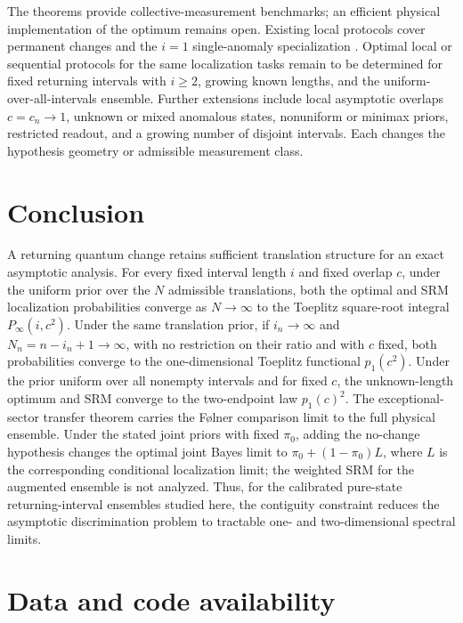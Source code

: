 The theorems provide collective-measurement benchmarks; an efficient physical
implementation of the optimum remains open. Existing local protocols cover
permanent changes and the \(i=1\) single-anomaly specialization
\cite{sentis2016,llorens2024}. Optimal local or sequential protocols for the
same localization tasks remain to be determined for fixed returning intervals
with \(i\ge2\), growing known lengths, and the uniform-over-all-intervals
ensemble. Further extensions
include local asymptotic overlaps \(c=c_n\to1\), unknown or mixed anomalous
states, nonuniform or minimax priors, restricted readout, and a growing number
of disjoint intervals. Each changes the hypothesis geometry or admissible
measurement class.

\section{Conclusion}\label{conclusion}

A returning quantum change retains sufficient translation structure for an
exact asymptotic analysis. For every fixed interval length \(i\) and fixed
overlap \(c\), under the uniform prior over the \(N\) admissible translations,
both the optimal and SRM localization probabilities converge as \(N\to\infty\)
to the Toeplitz square-root integral \(P_\infty(i,c^2)\). Under the same
translation prior, if \(i_n\to\infty\) and \(N_n=n-i_n+1\to\infty\), with no
restriction on their ratio and with \(c\) fixed, both probabilities converge to
the one-dimensional Toeplitz functional \(p_1(c^2)\). Under the prior uniform
over all nonempty intervals and for fixed
\(c\), the unknown-length optimum and SRM converge to the two-endpoint law
\(p_1(c)^2\). The exceptional-sector transfer theorem carries the Følner
comparison limit to the full physical ensemble. Under the stated joint priors
with fixed \(\pi_0\), adding the no-change hypothesis changes the optimal joint
Bayes limit to \(\pi_0+(1-\pi_0)L\), where \(L\) is the corresponding
conditional localization limit; the weighted SRM for the augmented ensemble is
not analyzed. Thus, for the calibrated pure-state returning-interval ensembles
studied here, the contiguity constraint reduces the asymptotic discrimination
problem to tractable one- and two-dimensional spectral limits.

\section*{Data and code availability}

